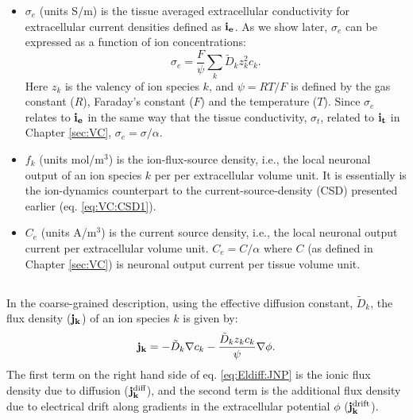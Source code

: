 \begin{itemize}
\item $\sigma_e$ (units S/m) is the tissue averaged extracellular conductivity for extracellular current densities defined as ${\bf i_e}$. As we show later, $\sigma_e$ can be expressed as a function of ion concentrations:
\begin{equation}
\sigma_e = \frac{F}{\psi}\sum_{k} \tilde{D}_k z_{k}^2 c_{k}.
\label{eq:Eldiff:sigma1}
\end{equation}
Here $z_{k}$ is the valency of ion species $k$, and $\psi=RT/F$ is defined by the gas constant ($R$), Faraday's constant ($F$) and the temperature ($T$). Since $\sigma_e$ relates to ${\bf i_e}$ in the same way that the tissue conductivity, $\sigma_t$, related to ${\bf i_t}$ in Chapter \ref{sec:VC}, $\sigma_e = \sigma /\alpha$.

\item $f_k$ (units mol/m$^3$) is the ion-flux-source density, i.e., the local neuronal output of an ion species $k$ per per extracellular volume unit. It is essentially is the ion-dynamics counterpart to the current-source-density (CSD) presented earlier (eq. \ref{eq:VC:CSD1}).

\item $C_e$ (units A/m$^3$) is the current source density, i.e., the local neuronal output current per extracellular volume unit. $C_e = C/\alpha$ where $C$ (as defined in Chapter \ref{sec:VC}) is neuronal output current per tissue volume unit.
\end{itemize}


\subsection{}
\label{sec:Eldiff:ionconcentrationdynamics}
In the coarse-grained description, using the effective diffusion constant, $\tilde{D}_k$, the flux density (${\bf j_k}$) of an ion species $k$ is given by:
\begin{equation}
{\bf j_k} = - \tilde{D}_k {\bf \nabla} c_{k} - \frac{\tilde{D}_k z_k c_k}{\psi} {\bf \nabla} \phi.
\label{eq:Eldiff:JNP}
\end{equation}
The first term on the right hand side of eq. \ref{eq:Eldiff:JNP} is the ionic flux density due to diffusion (${\bf j_{k}^\text{diff}}$), and the second term is the additional flux density due to electrical drift along gradients in the extracellular potential $\phi$ (${\bf j_{k}^\text{drift}}$). 

